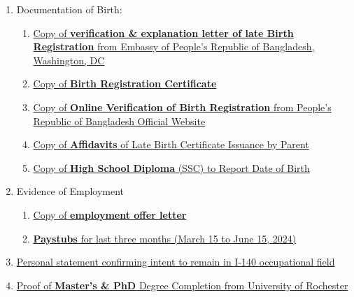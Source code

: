 \begin{enumerate}[label=\textbf{ Exhibit-\arabic*}]
     \item Documentation of Birth:
    \begin{enumerate}[label=\roman*.]
        \item \hyperref[exhibit5a]{Copy of \textbf{verification \& explanation letter of late Birth Registration} from Embassy of People's Republic of Bangladesh, Washington, DC}
        \item \hyperref[exhibit5b]{Copy of \textbf{Birth Registration Certificate}}
        \item \hyperref[exhibit5c]{Copy of \textbf{Online Verification of Birth Registration} from People's Republic of Bangladesh Official Website}
        \item \hyperref[exhibit5d]{Copy of \textbf{Affidavits} of Late Birth Certificate Issuance by Parent}
        \item \hyperref[exhibit5e]{Copy of \textbf{High School Diploma} (SSC) to Report Date of Birth}
    \end{enumerate}
    
    \item Evidence of Employment
    \begin{enumerate}[label=\roman*.]
        \item \hyperref[exhibit9a]{Copy of \textbf{employment offer letter}}
        \item \hyperref[exhibit9b]{\textbf{Paystubs} for last three months (March 15 to June 15, 2024)}
    \end{enumerate}
    
    \item \hyperref[exhibit10]{Personal statement confirming intent to remain in I-140 occupational field}
    
    \item \hyperref[exhibit11]{Proof of \textbf{Master’s \& PhD} Degree Completion from University of Rochester}
    


\end{enumerate}
